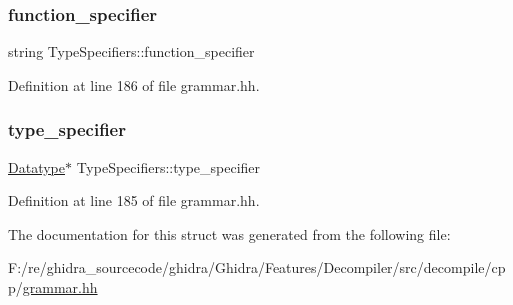 \subsubsection{\texorpdfstring{function\_specifier}{function\_specifier}}
{\footnotesize\ttfamily string Type\+Specifiers\+::function\+\_\+specifier}



Definition at line 186 of file grammar.\+hh.

\mbox{\label{struct_type_specifiers_a09d5f5bea9eb8e5fdb2e70143580beaf}} 
\subsubsection{\texorpdfstring{type\_specifier}{type\_specifier}}
{\footnotesize\ttfamily \mbox{\hyperlink{class_datatype}{Datatype}}$\ast$ Type\+Specifiers\+::type\+\_\+specifier}



Definition at line 185 of file grammar.\+hh.



The documentation for this struct was generated from the following file\+:\begin{DoxyCompactItemize}
\item 
F\+:/re/ghidra\+\_\+sourcecode/ghidra/\+Ghidra/\+Features/\+Decompiler/src/decompile/cpp/\mbox{\hyperlink{grammar_8hh}{grammar.\+hh}}\end{DoxyCompactItemize}
